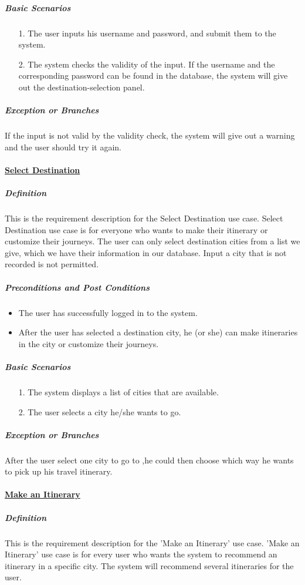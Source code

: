 \documentclass[10pt]{article}
\begin{document}
\begin{itemize}
		\subparagraph{Basic Scenarios} 
		\begin{itemize}
			\item[1.] The user inputs his username and password, and submit them to the system.
		
			\item[2.] The system checks the validity of the input. If the username and the corresponding password can be found in the database, the system will give out the destination-selection panel.
		\end{itemize}

		\subparagraph{Exception or Branches}
		If the input is not valid by the validity check, the system will give out a warning and the user should try it again.

		\paragraph{\underline{Select Destination}}
		\subparagraph{Definition} This is the requirement description for the Select Destination use case. Select Destination use case is for everyone who wants to make their itinerary or customize their journeys. The user can only select destination cities from a list we give, which we have their information in our database. Input a city that is not recorded is not permitted.

		\subparagraph{Preconditions and Post Conditions}
		\begin{itemize}
			\item The user has successfully logged in to the system.
			\item After the user has selected a destination city, he (or she) can make itineraries in the city or customize their journeys.
		\end{itemize}

		\subparagraph{Basic Scenarios}
		\begin{itemize}
			\item[1.] The system displays a list of cities that are available.
			\item[2.] The user selects a city he/she wants to go.
		\end{itemize}

		\subparagraph{Exception or Branches}
		After the user select one city to go to ,he could then choose which way he wants to pick up his travel itinerary.

		\paragraph{\underline{Make an Itinerary}}
		\subparagraph{Definition}
		This is the requirement description for the 'Make an Itinerary' use case. 'Make an Itinerary' use case is for every user who wants the system to recommend an itinerary in a specific city. The system will recommend several itineraries for the user.


\end{itemize}
\end{document}

